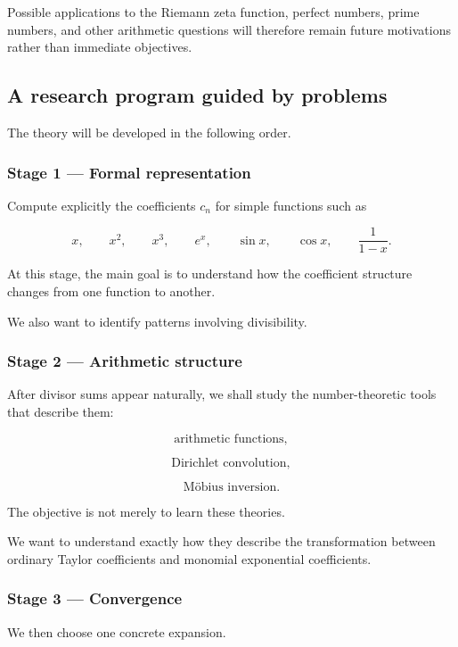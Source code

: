 Possible applications to the Riemann zeta function, perfect numbers, prime
numbers, and other arithmetic questions will therefore remain future
motivations rather than immediate objectives.

\subsection{A research program guided by problems}

The theory will be developed in the following order.

\subsubsection*{Stage 1 --- Formal representation}

Compute explicitly the coefficients \(c_n\) for simple functions such as

\[
x,
\qquad
x^2,
\qquad
x^3,
\qquad
e^x,
\qquad
\sin x,
\qquad
\cos x,
\qquad
\frac{1}{1-x}.
\]

At this stage, the main goal is to understand how the coefficient structure
changes from one function to another.

We also want to identify patterns involving divisibility.

\subsubsection*{Stage 2 --- Arithmetic structure}

After divisor sums appear naturally, we shall study the number-theoretic
tools that describe them:

\[
\text{arithmetic functions},
\]

\[
\text{Dirichlet convolution},
\]

\[
\text{Möbius inversion}.
\]

The objective is not merely to learn these theories.

We want to understand exactly how they describe the transformation between
ordinary Taylor coefficients and monomial exponential coefficients.

\subsubsection*{Stage 3 --- Convergence}

We then choose one concrete expansion.

